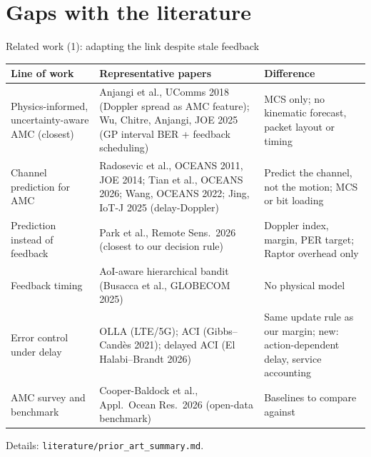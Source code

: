 \documentclass[aspectratio=169,11pt]{beamer}
\begin{document}
\section{Gaps with the literature}

\begin{frame}{Related work (1): adapting the link despite stale feedback}
\scriptsize\setlength{\tabcolsep}{3pt}\renewcommand{\arraystretch}{0.92}
\begin{tabular}{@{}L{0.21\textwidth}L{0.46\textwidth}L{0.29\textwidth}@{}}
\toprule
\textbf{Line of work} & \textbf{Representative papers} & \textbf{Difference}\\
\midrule
Physics-informed, uncertainty-aware AMC (closest) & Anjangi et al., UComms 2018 (Doppler spread as AMC feature); Wu, Chitre, Anjangi, JOE 2025 (GP interval BER + feedback scheduling) & MCS only; no kinematic forecast, packet layout or timing\\
Channel prediction for AMC & Radosevic et al., OCEANS 2011, JOE 2014; Tian et al., OCEANS 2026; Wang, OCEANS 2022; Jing, IoT-J 2025 (delay-Doppler) & Predict the channel, not the motion; MCS or bit loading\\
Prediction instead of feedback & Park et al., Remote Sens.\ 2026 (closest to our decision rule) & Doppler index, margin, PER target; Raptor overhead only\\
Feedback timing & AoI-aware hierarchical bandit (Busacca et al., GLOBECOM 2025) & No physical model\\
Error control under delay & OLLA (LTE/5G); ACI (Gibbs--Cand\`es 2021); delayed ACI (El Halabi--Brandt 2026) & \textcolor{amber!85!black}{Same update rule as our margin}; new: action-dependent delay, service accounting\\
AMC survey and benchmark & Cooper-Baldock et al., Appl.\ Ocean Res.\ 2026 (open-data benchmark) & Baselines to compare against\\
\bottomrule
\end{tabular}

\vspace{0.5mm}
{\color{mute} Details: \texttt{literature/prior\_art\_summary.md}.}
\end{frame}
\end{document}
